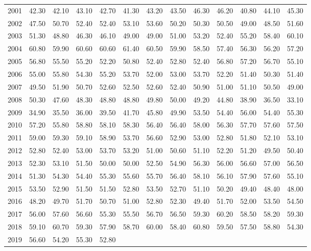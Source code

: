 \begin{longtable}{rrrrrrrrrrrrr}
  2001 & 42.30 & 42.10 & 43.10 & 42.70 & 41.30 & 43.20 & 43.50 & 46.30 & 46.20 & 40.80 & 44.10 & 45.30 \\ 
  2002 & 47.50 & 50.70 & 52.40 & 52.40 & 53.10 & 53.60 & 50.20 & 50.30 & 50.50 & 49.00 & 48.50 & 51.60 \\ 
  2003 & 51.30 & 48.80 & 46.30 & 46.10 & 49.00 & 49.00 & 51.00 & 53.20 & 52.40 & 55.20 & 58.40 & 60.10 \\ 
  2004 & 60.80 & 59.90 & 60.60 & 60.60 & 61.40 & 60.50 & 59.90 & 58.50 & 57.40 & 56.30 & 56.20 & 57.20 \\ 
  2005 & 56.80 & 55.50 & 55.20 & 52.20 & 50.80 & 52.40 & 52.80 & 52.40 & 56.80 & 57.20 & 56.70 & 55.10 \\ 
  2006 & 55.00 & 55.80 & 54.30 & 55.20 & 53.70 & 52.00 & 53.00 & 53.70 & 52.20 & 51.40 & 50.30 & 51.40 \\ 
  2007 & 49.50 & 51.90 & 50.70 & 52.60 & 52.50 & 52.60 & 52.40 & 50.90 & 51.00 & 51.10 & 50.50 & 49.00 \\ 
  2008 & 50.30 & 47.60 & 48.30 & 48.80 & 48.80 & 49.80 & 50.00 & 49.20 & 44.80 & 38.90 & 36.50 & 33.10 \\ 
  2009 & 34.90 & 35.50 & 36.00 & 39.50 & 41.70 & 45.80 & 49.90 & 53.50 & 54.40 & 56.00 & 54.40 & 55.30 \\ 
  2010 & 57.20 & 55.80 & 58.80 & 58.10 & 58.30 & 56.40 & 56.40 & 58.00 & 56.30 & 57.70 & 57.60 & 57.50 \\ 
  2011 & 59.00 & 59.30 & 59.10 & 58.90 & 53.70 & 56.60 & 52.90 & 53.00 & 52.80 & 51.80 & 52.10 & 53.10 \\ 
  2012 & 52.80 & 52.40 & 53.00 & 53.70 & 53.20 & 51.00 & 50.60 & 51.10 & 52.20 & 51.20 & 49.50 & 50.40 \\ 
  2013 & 52.30 & 53.10 & 51.50 & 50.00 & 50.00 & 52.50 & 54.90 & 56.30 & 56.00 & 56.60 & 57.00 & 56.50 \\ 
  2014 & 51.30 & 54.30 & 54.40 & 55.30 & 55.60 & 55.70 & 56.40 & 58.10 & 56.10 & 57.90 & 57.60 & 55.10 \\ 
  2015 & 53.50 & 52.90 & 51.50 & 51.50 & 52.80 & 53.50 & 52.70 & 51.10 & 50.20 & 49.40 & 48.40 & 48.00 \\ 
  2016 & 48.20 & 49.70 & 51.70 & 50.70 & 51.00 & 52.80 & 52.30 & 49.40 & 51.70 & 52.00 & 53.50 & 54.50 \\ 
  2017 & 56.00 & 57.60 & 56.60 & 55.30 & 55.50 & 56.70 & 56.50 & 59.30 & 60.20 & 58.50 & 58.20 & 59.30 \\ 
  2018 & 59.10 & 60.70 & 59.30 & 57.90 & 58.70 & 60.00 & 58.40 & 60.80 & 59.50 & 57.50 & 58.80 & 54.30 \\ 
  2019 & 56.60 & 54.20 & 55.30 & 52.80 &  &  &  &  &  &  &  &  \\ 
   \hline
\hline
\end{longtable}
